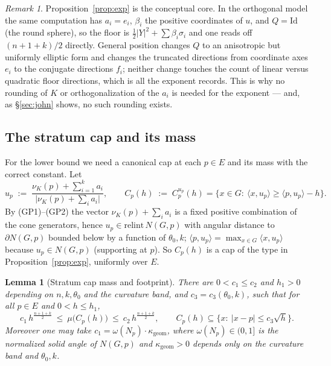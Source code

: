 \documentclass[11pt]{article}
\newtheorem{lemma}[theorem]{Lemma}
\theoremstyle{definition}
\theoremstyle{remark}
\newtheorem{remark}[theorem]{Remark}
\newcommand{\nor}{\nu_K}
\begin{document}
\begin{remark}\label{rem:why}
Proposition~\ref{prop:exp} is the conceptual core.  In the orthogonal model
the same computation has $a_i=e_i$, $\beta_i$ the positive coordinates of $u$,
and $Q=\mathrm{Id}$ (the round sphere), so the floor is
$\tfrac12|Y|^2+\sum\beta_i\sigma_i$ and one reads off $(n+1+k)/2$ directly.
General position changes $Q$ to an anisotropic but uniformly elliptic form and
changes the truncated directions from coordinate axes $e_i$ to the conjugate
directions $f_i$; neither change touches the count of linear versus quadratic
floor directions, which is all the exponent records.  This is why no rounding
of $K$ or orthogonalization of the $a_i$ is needed for the exponent --- and,
as \S\ref{sec:john} shows, no such rounding exists.
\end{remark}

\subsection{The stratum cap and its mass}\label{ss:capmass}

For the lower bound we need a canonical cap at each $p\in E$ and its mass with
the correct constant.  Let
\[
u_p\;:=\;\frac{\nor(p)+\sum_{i=1}^k a_i}{\bigl|\nor(p)+\sum_i a_i\bigr|},
\qquad
C_p(h)\;:=\;C_p^{u_p}(h)
=\{x\in G:\ \langle x,u_p\rangle\ge\langle p,u_p\rangle-h\}.
\]
By (GP1)--(GP2) the vector $\nor(p)+\sum_i a_i$ is a fixed positive combination
of the cone generators, hence $u_p\in\mathrm{relint}\,N(G,p)$ with angular
distance to $\partial N(G,p)$ bounded below by a function of $\theta_0,k$;
$\langle p,u_p\rangle=\max_{x\in G}\langle x,u_p\rangle$ because $u_p\in
N(G,p)$ (supporting at $p$).  So $C_p(h)$ is a cap of the type in
Proposition~\ref{prop:exp}, uniformly over $E$.

\begin{lemma}[Stratum cap mass and footprint]\label{lem:capmass}
There are $0<c_1\le c_2$ and $h_1>0$ depending on $n,k,\theta_0$ and the
curvature band, and $c_3=c_3(\theta_0,k)$, such that for all $p\in E$ and
$0<h\le h_1$,
\[
c_1\,h^{\frac{n+1+k}2}\ \le\ \mu\bigl(C_p(h)\bigr)\ \le\
c_2\,h^{\frac{n+1+k}2},
\qquad
C_p(h)\subseteq\{x:\ |x-p|\le c_3\sqrt h\}.
\]
Moreover one may take $c_1=\omega(N_p)\cdot\kappa_{\mathrm{geom}}$, where
$\omega(N_p)\in(0,1]$ is the normalized solid angle of $N(G,p)$ and
$\kappa_{\mathrm{geom}}>0$ depends only on the curvature band and
$\theta_0,k$.
\end{lemma}
\end{document}

